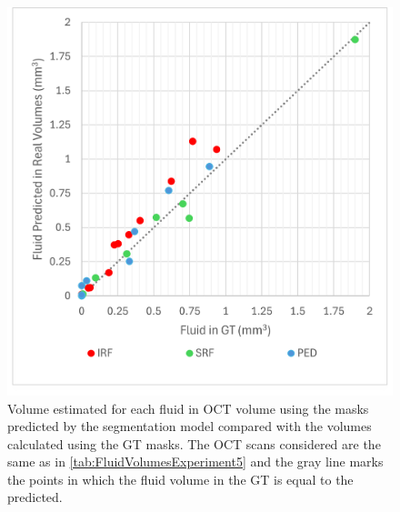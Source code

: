 \begin{figure}[!ht]
	\centering	\includegraphics[width=0.66\linewidth]{figures/FluidVolumeScatterExperiment5.png}
	\caption{Volume estimated for each fluid in OCT volume using the masks predicted by the segmentation model compared with the volumes calculated using the GT masks. The OCT scans considered are the same as in \ref{tab:FluidVolumesExperiment5} and the gray line marks the points in which the fluid volume in the GT is equal to the predicted.}
	\label{fig:FluidVolumeScatterExperiment5}
\end{figure}

